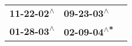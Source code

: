 \begin{supertabular}{lll}
 \textbf{11-22-02\textsuperscript{$\wedge$}} &   \textbf{09-23-03\textsuperscript{$\wedge$}} \\
 \textbf{01-28-03\textsuperscript{$\wedge$}} &  \textbf{02-09-04\textsuperscript{$\wedge$*}} \\
\end{supertabular}
